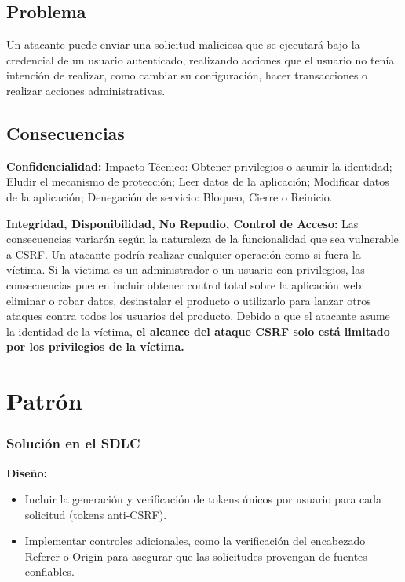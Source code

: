 \subsection{Problema} Un atacante puede enviar una solicitud maliciosa que se ejecutará bajo la credencial de un usuario autenticado, realizando acciones que el usuario no tenía intención de realizar, como cambiar su configuración, hacer transacciones o realizar acciones administrativas.

\subsection{Consecuencias} 

\textbf{Confidencialidad:} Impacto Técnico: Obtener privilegios o asumir la identidad; Eludir el mecanismo de protección; Leer datos de la aplicación; Modificar datos de la aplicación; Denegación de servicio: Bloqueo, Cierre o Reinicio. 

\textbf{Integridad, Disponibilidad, No Repudio, Control de Acceso: }Las consecuencias variarán según la naturaleza de la funcionalidad que sea vulnerable a CSRF. Un atacante podría realizar cualquier operación como si fuera la víctima. Si la víctima es un administrador o un usuario con privilegios, las consecuencias pueden incluir obtener control total sobre la aplicación web: eliminar o robar datos, desinstalar el producto o utilizarlo para lanzar otros ataques contra todos los usuarios del producto. Debido a que el atacante asume la identidad de la víctima, \textbf{el alcance del ataque CSRF solo está limitado por los privilegios de la víctima. }

\section{Patrón}

\subsubsection{Solución en el SDLC} \textbf{Diseño:} \begin{itemize} \item Incluir la generación y verificación de tokens únicos por usuario para cada solicitud (tokens anti-CSRF). \item Implementar controles adicionales, como la verificación del encabezado Referer o Origin para asegurar que las solicitudes provengan de fuentes confiables. \end{itemize}

